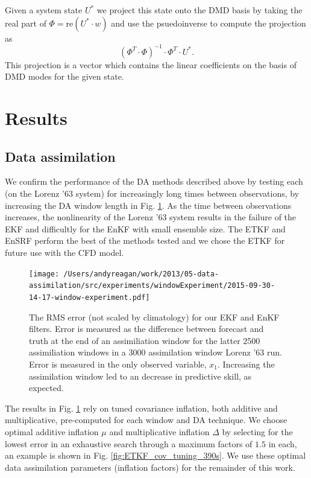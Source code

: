 Given a system state $U^*$ we project this state onto the DMD basis by taking the real part of $\Phi = \text{re}\left (U^*\cdot w\right)$ and use the psuedoinverse to compute the projection as $$(\Phi^T \cdot \Phi)^{-1} \cdot \Phi ^T \cdot U^*.$$
This projection is a vector which contains the linear coefficients on the basis of DMD modes for the given state.

\section*{Results}

\subsection*{Data assimilation}
\label{data_assimilation_section}

We confirm the performance of the DA methods described above by testing each (on the Lorenz '63 system) for increasingly long times between observations, by increasing the DA window length in Fig. \ref{fig:window_test}.
As the time between observations increases, the nonlinearity of the Lorenz '63 system results in the failure of the EKF and difficultly for the EnKF with small ensemble size.
The ETKF and EnSRF perform the best of the methods tested and we chose the ETKF for future use with the CFD model.

\begin{figure}[h]
  \centering
  \texttt{[image: /Users/andyreagan/work/2013/05-data-assimilation/src/experiments/windowExperiment/2015-09-30-14-17-window-experiment.pdf]}
  \caption[The RMS error is reported for our EKF and EnKF filters]{
    The RMS error (not scaled by climatology) for our EKF and EnKF filters.
    Error is measured as the difference between forecast and truth at the end of an assimiliation window for the latter 2500 assimiliation windows in a 3000 assimilation window Lorenz '63 run.
    Error is measured in the only observed variable, $x_1$.
    Increasing the assimilation window led to an decrease in predictive skill, as expected.
  }
  \label{fig:window_test}
\end{figure}

The results in Fig. \ref{fig:window_test} rely on tuned covariance inflation, both additive and multiplicative, pre-computed for each window and DA technique.
We choose optimal additive inflation $\mu$ and multiplicative inflation $\Delta$ by selecting for the lowest error in an exhaustive search through a maximum factors of $1.5$ in each, an example is shown in Fig. \ref{fig:ETKF_cov_tuning_390s}.
We use these optimal data assimilation parameters (inflation factors) for the remainder of this work.

